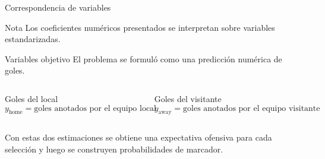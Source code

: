 \documentclass[aspectratio=169]{beamer}
\begin{document}
\begin{frame}{Correspondencia de variables}
\scriptsize
\centering
{}

\vspace{0.35cm}
\begin{block}{Nota}
Los coeficientes numéricos presentados se interpretan sobre variables estandarizadas.
\end{block}
\end{frame}

\begin{frame}{Variables objetivo}
\justifying
El problema se formuló como una predicción numérica de goles.

\vspace{0.3cm}
\begin{columns}[T]
\begin{block}{Goles del local}
\[
y_{\text{home}} = \text{goles anotados por el equipo local}
\]
\end{block}

\begin{block}{Goles del visitante}
\[
y_{\text{away}} = \text{goles anotados por el equipo visitante}
\]
\end{block}
\end{columns}

\vspace{0.3cm}
Con estas dos estimaciones se obtiene una expectativa ofensiva para cada selección y luego se construyen probabilidades de marcador.
\end{frame}
\end{document}
